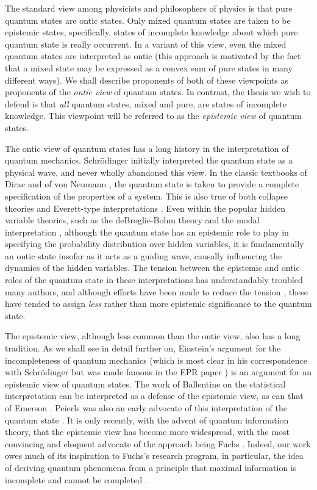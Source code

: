 \documentclass[pra,twocolumn,nofootinbib,showpacs]{revtex4}
\begin{document}
The standard view among physicists and philosophers of physics is that pure
quantum states are ontic states. Only mixed quantum states are taken to be
epistemic states, specifically, states of incomplete knowledge about which
pure quantum state is really occurrent. In a variant of this view, even the
mixed quantum states are interpreted as ontic (this approach is motivated by
the fact that a mixed state may be expressed as a convex sum of pure states
in many different ways). We shall describe proponents of both of these
viewpoints as proponents of the \emph{ontic view} of quantum states. In
contrast, the thesis we wish to defend is that \emph{all }quantum states,
mixed and pure, are states of incomplete knowledge. This viewpoint will be
referred to as the \emph{epistemic view} of quantum states.

The ontic view of quantum states has a long history in the interpretation of
quantum mechanics. Schr\"{o}dinger initially interpreted the quantum state
as a physical wave, and never wholly abandoned this view. In the classic
textbooks of Dirac \cite{Dirac} and of von Neumann \cite{vonNeumann}, the
quantum state is taken to provide a complete specification of the properties
of a system. This is also true of both collapse theories \cite%
{GRW,Pearle,review} and Everett-type interpretations \cite{Everett,Barrett}.
Even within the popular hidden variable theories, such as the deBroglie-Bohm
theory \cite{BohmHiley,Holland,Valentini} and the modal interpretation \cite%
{KDH,DieksVermaas,Bacciagaluppi}, although the quantum state has an
epistemic role to play in specifying the probability distribution over
hidden variables, it is fundamentally an ontic state insofar as it acts as a
guiding wave, causally influencing the dynamics of the hidden variables. The
tension between the epistemic and ontic roles of the quantum state in these
interpretations has understandably troubled many authors, and although
efforts have been made to reduce the tension \cite{Valentini}, these have
tended to assign \emph{less} rather than more epistemic significance to the
quantum state.

The epistemic view, although less common than the ontic view, also
has a long tradition. As we shall see in detail further on,
Einstein's argument for the incompleteness of quantum mechanics
(which is most clear in his correspondence with Schr\"{o}dinger
\cite{Einsteinletters} but was made famous in the EPR paper
\cite{EPR}) is an argument for an epistemic view of quantum
states. The work of Ballentine on the statistical interpretation
\cite{BallentineRMP,Ballentine} can be interpreted as a defense of
the epistemic view, as can that of Emerson \cite{Emerson}. Peierls
was also an early advocate of this interpretation of the quantum
state \cite{Peierls}. It is only recently, with the advent of
quantum information theory, that the epistemic view has become
more widespread, with the most convincing and eloquent advocate of
the approach being Fuchs \cite{Fuchs}. Indeed, our work owes much
of its inspiration to Fuchs's research program, in particular, the
idea of deriving quantum phenomena from a principle that maximal
information is incomplete and cannot be completed
\cite{Fuchscloning,Fuchssamizdat}.
\end{document}
